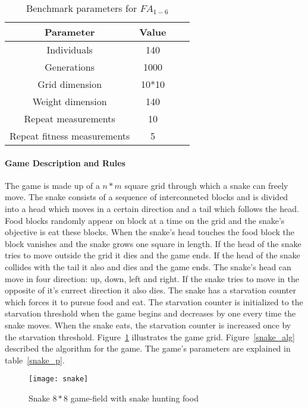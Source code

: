 \begin{table}[H]
  \centering
  \begin{center}
    \footnotesize
    \begin{tabular}{ | c | c | c | c | }
      \hline
      Parameter & Value  \\ \hline
      Individuals & 140 \\ \hline
      Generations & 1000 \\ \hline
      Grid dimension & 10*10 \\ \hline
      Weight dimension & 140 \\ \hline
      Repeat measurements & 10 \\ \hline
      Repeat fitness measurements & 5 \\ \hline
    \end{tabular}
  \end{center}
  \caption{Benchmark parameters for $FA_{1-6}$}
  \label{table:fa1-6_params}
\end{table}

\paragraph{Game Description and Rules}

The game is made up of a $n*m$ square grid through which a snake can freely move. The snake consists of a sequence of interconneted blocks and is divided into a head which moves in a certain direction and a tail which follows the head. Food blocks randomly appear on block at a time on the grid and the snake's objective is eat these blocks. When the snake's head touches the food block the block vanishes and the snake grows one square in length. If the head of the snake tries to move outside the grid it dies and the game ends. If the head of the snake collides with the tail it also and dies and the game ends. The snake's head can move in four direction: up, down, left and right. If the snake tries to move in the opposite of it's currect direction it also dies. The snake has a starvation counter which forces it to pursue food and eat. The starvation counter is initialized to the starvation threshold when the game begins and decreases by one every time the snake moves. When the snake eats, the starvation counter is increased once by the starvation threshold. Figure~\ref{snake} illustrates the game grid. Figure~\ref{snake_alg} described the algorithm for the game. The game's parameters are explained in table~\ref{snake_p}.

\begin{figure}[H]
  \centering
  \texttt{[image: snake]}
  \caption{Snake $8*8$ game-field with snake hunting food}
  \label{snake}
\end{figure}


